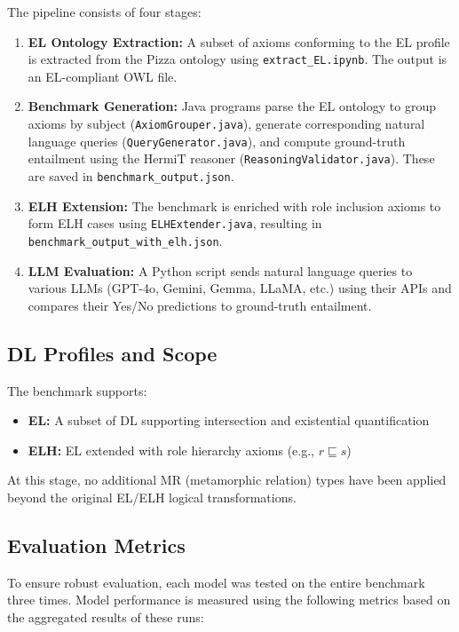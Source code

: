 \documentclass[11pt]{article}
\begin{document}
\newpage

The pipeline consists of four stages:

\begin{enumerate}
    \item \textbf{EL Ontology Extraction:} A subset of axioms conforming to the EL profile is extracted from the Pizza ontology using \texttt{extract\_EL.ipynb}. The output is an EL-compliant OWL file.
    
    \item \textbf{Benchmark Generation:} Java programs parse the EL ontology to group axioms by subject (\texttt{AxiomGrouper.java}), generate corresponding natural language queries (\texttt{QueryGenerator.java}), and compute ground-truth entailment using the HermiT reasoner (\texttt{ReasoningValidator.java}). These are saved in \texttt{benchmark\_output.json}.
    
    \item \textbf{ELH Extension:} The benchmark is enriched with role inclusion axioms to form ELH cases using \texttt{ELHExtender.java}, resulting in \texttt{benchmark\_output\_with\_elh.json}.
    
    \item \textbf{LLM Evaluation:} A Python script sends natural language queries to various LLMs (GPT-4o, Gemini, Gemma, LLaMA, etc.) using their APIs and compares their Yes/No predictions to ground-truth entailment.
\end{enumerate}

\subsection{DL Profiles and Scope}
The benchmark supports:
\begin{itemize}
    \item \textbf{EL:} A subset of DL supporting intersection and existential quantification
    \item \textbf{ELH:} EL extended with role hierarchy axioms (e.g., $r \sqsubseteq s$)
\end{itemize}
At this stage, no additional MR (metamorphic relation) types have been applied beyond the original EL/ELH logical transformations.

\subsection{Evaluation Metrics}
To ensure robust evaluation, each model was tested on the entire benchmark three times. Model performance is measured using the following metrics based on the aggregated results of these runs:
\end{document}
